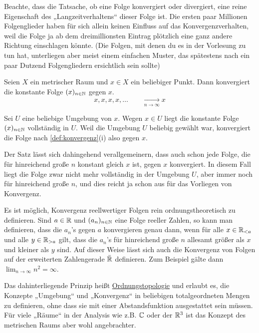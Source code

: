\begin{bem}
    Beachte, dass die Tatsache, ob eine Folge konvergiert oder divergiert, eine reine Eigenschaft des „Langzeitverhaltens“ dieser Folge ist. Die ersten paar Millionen Folgenglieder haben für sich allein keinen Einfluss auf das Konvergenzverhalten, weil die Folge ja ab dem dreimillionsten Eintrag plötzlich eine ganz andere Richtung einschlagen könnte. (Die Folgen, mit denen du es in der Vorlesung zu tun hat, unterliegen aber meist einem einfachen Muster, das spätestens nach ein paar Dutzend Folgengliedern ersichtlich sein sollte)
\end{bem}


\begin{bsp}
    Seien $X$ ein metrischer Raum und $x \in X$ ein beliebiger Punkt. Dann konvergiert die konstante Folge $(x)_{n\in \mathbb N}$ gegen $x$.
        \[ x,x,x,x,\dots \qquad \xrightarrow[n\to \infty]{} x \]
\end{bsp}
    
    
\begin{bew}
    Sei $U$ eine beliebige Umgebung von $x$. Wegen $x\in U$ liegt die konstante Folge $(x)_{n\in \mathbb N}$ vollständig in $U$. Weil die Umgebung $U$ beliebig gewählt war, konvergiert die Folge nach \cref{def:konvergenz}(i) also gegen $x$.
\end{bew}


\begin{bem}
    Der Satz lässt sich dahingehend verallgemeinern, dass auch schon jede Folge, die für hinreichend große $n$ konstant gleich $x$ ist, gegen $x$ konvergiert. In diesem Fall liegt die Folge zwar nicht mehr vollständig in der Umgebung $U$, aber immer noch für hinreichend große $n$, und dies reicht ja schon aus für das Vorliegen von Konvergenz.
\end{bem}


\begin{vorschau}[* Ordnungstopologie]
    Es ist möglich, Konvergenz reellwertiger Folgen rein ordnungstheoretisch zu definieren. Sind $a\in \mathbb R$ und $(a_n)_{n\in \mathbb N}$ eine Folge reeller Zahlen, so kann man definieren, dass die $a_n$'s gegen $a$ konvergieren genau dann, wenn für alle $x\in \mathbb R_{<a}$ und alle $y\in \mathbb R_{>a}$ gilt, dass die $a_n$'s für hinreichend große $n$ allesamt größer als $x$ und kleiner als $y$ sind. Auf dieser Weise lässt sich auch die Konvergenz von Folgen auf der erweiterten Zahlengerade $\bar {\mathbb R}$ definieren. Zum Beispiel gälte dann $\lim_{n\to\infty} n^2=\infty$.
    
    Das dahinterliegende Prinzip heißt \href{https://de.wikipedia.org/wiki/Ordnungstopologie}{Ordnungstopologie} und erlaubt es, die Konzepte „Umgebung“ und „Konvergenz“ in beliebigen totalgeordneten Mengen zu definieren, ohne dass sie mit einer Abstandsfunktion ausgestattet sein müssen. Für viele „Räume“ in der Analysis wie z.B. $\mathbb C$ oder der $\mathbb R^3$ ist das Konzept des metrischen Raums aber wohl angebrachter.
\end{vorschau}





